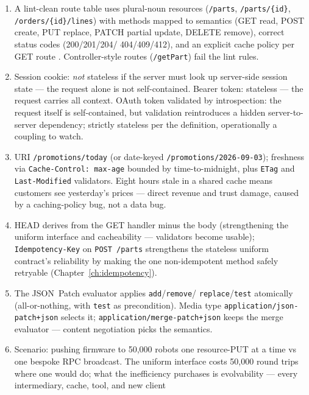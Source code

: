 \begin{enumerate}[label=\textbf{(7.\arabic*)}, leftmargin=3.2em]
  \item A lint-clean route table uses plural-noun resources
    (\texttt{/parts}, \texttt{/parts/\{id\}}, \texttt{/orders/\{id\}/lines})
    with methods mapped to semantics (GET read, POST create, PUT replace,
    PATCH partial update, DELETE remove), correct status codes (200/201/204/
    404/409/412), and an explicit cache policy per GET route
    \cite{fielding2000rest}. Controller-style routes (\texttt{/getPart})
    fail the lint rules.
  \item Session cookie: \emph{not} stateless if the server must look up
    server-side session state --- the request alone is not self-contained.
    Bearer token: stateless --- the request carries all context. OAuth token
    validated by introspection: the request itself is self-contained, but
    validation reintroduces a hidden server-to-server dependency; strictly
    stateless per the definition, operationally a coupling to watch.
  \item URI \texttt{/promotions/today} (or date-keyed
    \texttt{/promotions/2026-09-03}); freshness via \texttt{Cache-Control:
    max-age} bounded by time-to-midnight, plus \texttt{ETag} and
    \texttt{Last-Modified} validators. Eight hours stale in a shared cache
    means customers see yesterday's prices --- direct revenue and trust
    damage, caused by a caching-policy bug, not a data bug.
  \item HEAD derives from the GET handler minus the body (strengthening the
    uniform interface and cacheability --- validators become usable);
    \texttt{Idempotency-Key} on \texttt{POST /parts} strengthens the
    stateless uniform contract's reliability by making the one
    non-idempotent method safely retryable (Chapter~\ref{ch:idempotency}).
  \item The JSON~Patch evaluator applies \texttt{add}/\texttt{remove}/
    \texttt{replace}/\texttt{test} atomically (all-or-nothing, with
    \texttt{test} as precondition). Media type
    \texttt{application/json-patch+json} selects it;
    \texttt{application/merge-patch+json} keeps the merge evaluator ---
    content negotiation picks the semantics.
  \item Scenario: pushing firmware to 50{,}000 robots one resource-PUT at a
    time vs one bespoke RPC broadcast. The uniform interface costs
    50{,}000 round trips where one would do; what the inefficiency purchases
    is evolvability --- every intermediary, cache, tool, and new client

\end{enumerate}
